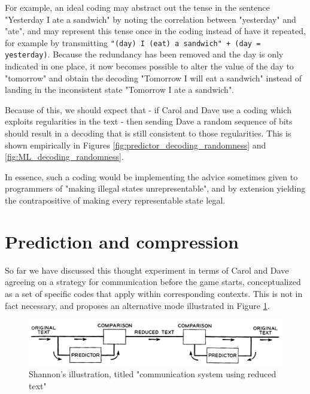 For example, an ideal coding may abstract out the tense in the sentence "Yesterday I ate a sandwich" by noting the correlation between "yesterday" and "ate", and may represent this tense once in the coding instead of have it repeated, for example by transmitting \texttt{"(day) I (eat) a sandwich" + (day = yesterday)}. Because the redundancy has been removed and the day is only indicated in one place, it now becomes possible to alter the value of the day to "tomorrow" and obtain the decoding "Tomorrow I will eat a sandwich" instead of landing in the inconsistent state "Tomorrow I ate a sandwich".

Because of this, we should expect that - if Carol and Dave use a coding which exploits regularities in the text - then sending Dave a random sequence of bits should result in a decoding that is still consistent to those regularities. This is shown empirically in Figures \ref{fig:predictor_decoding_randomness} and \ref{fig:ML_decoding_randomness}.


In essence, such a coding would be implementing the advice sometimes given to programmers of "making illegal states unrepresentable", and by extension yielding the contrapositive of making every representable state legal.

\section{Prediction and compression}

So far we have discussed this thought experiment in terms of Carol and Dave agreeing on a strategy for communication before the game starts, conceptualized as a set of specific codes that apply within corresponding contexts. This is not in fact necessary, and \textcite{Shannon1951} proposes an alternative mode illustrated in Figure \ref{fig:twin_communication}.

\begin{figure}[h]
\centering
\includegraphics[width=\textwidth]{img/twin_communication.png}
\caption{Shannon's illustration, titled "communication system using reduced text"}
\label{fig:twin_communication}
\end{figure}

